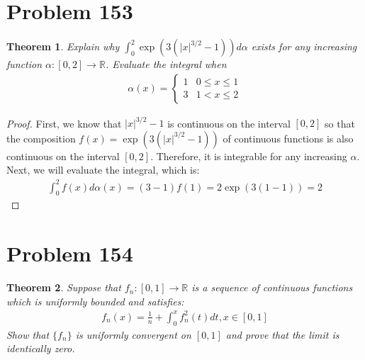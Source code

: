 \documentclass[psamsfonts]{amsart}
\newtheorem{thm}{Theorem}[section]
\theoremstyle{definition}
\theoremstyle{remark}
\numberwithin{equation}{section}
\begin{document}
\section{Problem 153}

\begin{thm}
Explain why $\int_0^2 \exp(3 (|x|^{3/2} - 1)) d \alpha$ exists for any increasing function $\alpha:[0,2] \to \mathbb{R}$. Evaluate the integral when
\begin{eqnarray}
\alpha(x) = \left\{ \begin{array}{ll}
1 & 0 \leq x \leq 1 \\
3 & 1 < x \leq 2 
\end{array} \right.
\end{eqnarray}
\end{thm}

\begin{proof}
First, we know that $|x|^{3/2} - 1$ is continuous on the interval $[0,2]$ so that the composition $f(x) = \exp(3(|x|^{3/2} - 1))$ of continuous functions is also continuous on the interval $[0,2]$. Therefore, it is integrable for any increasing $\alpha$. Next, we will evaluate the integral, which is:
\begin{eqnarray}
\int_0^2 f(x) d \alpha(x) = (3-1) f(1) = 2 \exp(3(1- 1)) = 2 
\end{eqnarray}
\end{proof}

\section{Problem 154}

\begin{thm}
Suppose that $f_n: [0,1] \to \mathbb{R}$ is a sequence of continuous functions which is uniformly bounded and satisfies:
\begin{eqnarray}
f_n(x) = \frac{1}{n} + \int_0^x f_n^2(t) dt, x \in [0,1]
\end{eqnarray}
Show that $\{ f_n \}$ is uniformly convergent on $[0,1]$ and prove that the limit is identically zero.
\end{thm}
\end{document}
